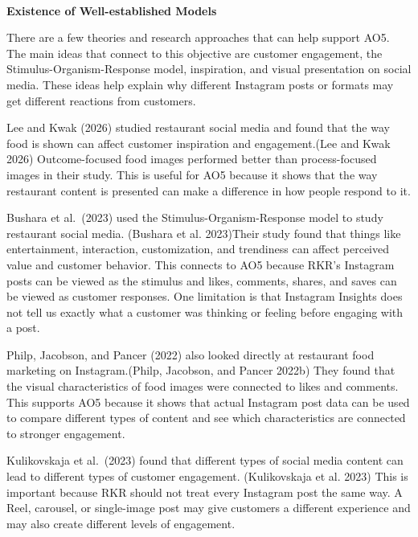 \documentclass[
  12pt,
  letterpaper,
  DIV=11,
  numbers=noendperiod]{scrartcl}
\makeatletter
\let\oldparagraph\paragraph
\renewcommand{\paragraph}{
    \@ifstar
      \xxxParagraphStar
      \xxxParagraphNoStar
  }
\newcommand{\xxxParagraphStar}[1]{\oldparagraph*{#1}\mbox{}}
\newcommand{\xxxParagraphNoStar}[1]{\oldparagraph{#1}\mbox{}}
\makeatother
\begin{document}
\paragraph{\texorpdfstring{\textbf{Existence of Well-established
Models}}{Existence of Well-established Models}}\label{existence-of-well-established-models-3}

There are a few theories and research approaches that can help support
AO5. The main ideas that connect to this objective are customer
engagement, the Stimulus-Organism-Response model, inspiration, and
visual presentation on social media. These ideas help explain why
different Instagram posts or formats may get different reactions from
customers.

Lee and Kwak (2026) studied restaurant social media and found that the
way food is shown can affect customer inspiration and engagement.(Lee
and Kwak 2026) Outcome-focused food images performed better than
process-focused images in their study. This is useful for AO5 because it
shows that the way restaurant content is presented can make a difference
in how people respond to it.

Bushara et al.~(2023) used the Stimulus-Organism-Response model to study
restaurant social media. (Bushara et al. 2023)Their study found that
things like entertainment, interaction, customization, and trendiness
can affect perceived value and customer behavior. This connects to AO5
because RKR's Instagram posts can be viewed as the stimulus and likes,
comments, shares, and saves can be viewed as customer responses. One
limitation is that Instagram Insights does not tell us exactly what a
customer was thinking or feeling before engaging with a post.

Philp, Jacobson, and Pancer (2022) also looked directly at restaurant
food marketing on Instagram.(Philp, Jacobson, and Pancer 2022b) They
found that the visual characteristics of food images were connected to
likes and comments. This supports AO5 because it shows that actual
Instagram post data can be used to compare different types of content
and see which characteristics are connected to stronger engagement.

Kulikovskaja et al.~(2023) found that different types of social media
content can lead to different types of customer engagement.
(Kulikovskaja et al. 2023) This is important because RKR should not
treat every Instagram post the same way. A Reel, carousel, or
single-image post may give customers a different experience and may also
create different levels of engagement.
\end{document}
